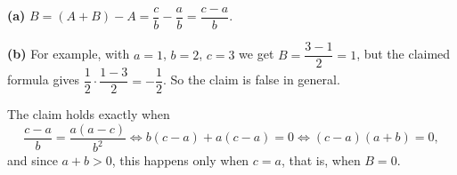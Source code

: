 \textbf{(a)} $B=(A+B)-A=\dfrac cb-\dfrac ab=\boxed{\dfrac{c-a}{b}}$.

\textbf{(b)} For example, with $a=1$, $b=2$, $c=3$ we get $B=\dfrac{3-1}{2}=1$, but the claimed formula gives $\dfrac12\cdot\dfrac{1-3}{2}=-\dfrac12$. So the claim is false in general.

The claim holds exactly when
\[\dfrac{c-a}{b}=\dfrac{a(a-c)}{b^2}\iff b(c-a)+a(c-a)=0\iff(c-a)(a+b)=0,\]
and since $a+b>0$, this happens only when $c=a$, that is, when $B=0$.
